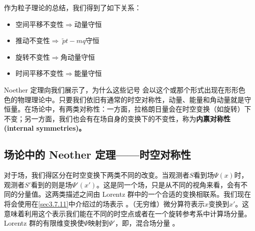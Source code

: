 作为粒子理论的总结，我们得到了如下关系：
\begin{itemize}
\item 空间平移不变性$\Rightarrow$动量守恒
\item 推动不变性$\Rightarrow~\tilde{p}t-mq$守恒
\item 旋转不变性$\Rightarrow$角动量守恒
\item 时间平移不变性$\Rightarrow$能量守恒
\end{itemize}
Noether 定理向我们展示了，为什么这些记号%
%
会以这个或那个形式出现在形形色色的物理理论中。只要我们依旧有通常的时空对称性，动量、能量和角动量就是守恒量。在场论中，有两类对称性：一方面，拉格朗日量会在时空变换（如旋转）下不变；另一方面，我们也会有在场自身的变换下的不变性，称为{\bf 内禀对称性(internal symmetries)。}

\subsection{场论中的 Neother 定理——时空对称性}\label{sec4.5.2}
对于场，我们得区分在时空变换下两类不同的改变。当观测者$S$看到场$\Psi(x)$时，观测者$S'$看到的则是场$\Psi'(x')$。这是同一个场，只是从不同的视角来看，会有不同的分量值。这两类描述之间由 Lorentz 群中的一个合适的变换相联系。我们现在将会使用在\ref{sec3.7.11}中介绍过的场表示%
。（无穷维）微分算符表示$x$变换到$x'$。这意味着利用这个表示我们能在不同的时空点或者在一个旋转参考系中计算场分量。Lorentz 群的有限维变换使$\Psi$映射到$\Psi'$，即，混合场分量%
。

